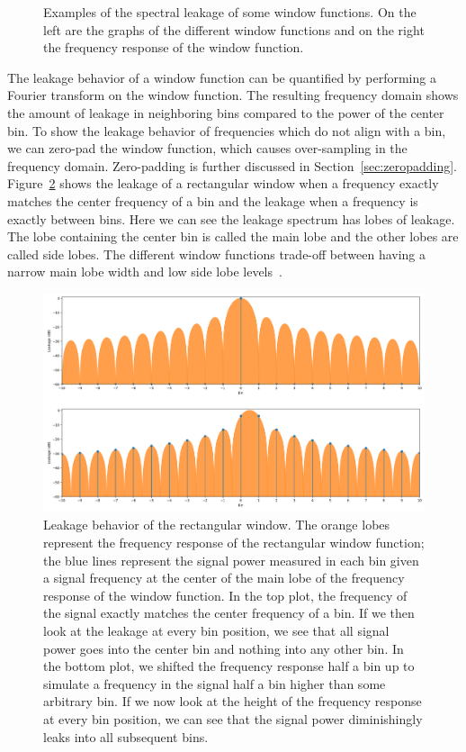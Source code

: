 \documentclass[a4paper,10pt,twocolumn]{article}
\begin{document}
\begin{figure}[h]
    \caption{Examples of the spectral leakage of some window functions. On the left are the graphs of the different window functions and on the right the frequency response of the window function.}
    \label{fig:windowfunceffect}
\end{figure}

The leakage behavior of a window function can be quantified by performing a Fourier transform on the window function. The resulting frequency domain shows the amount of leakage in neighboring bins compared to the power of the center bin. To show the leakage behavior of frequencies which do not align with a bin, we can zero-pad the window function, which causes over-sampling in the frequency domain. Zero-padding is further discussed in Section~\ref{sec:zeropadding}. Figure~\ref{fig:winleak} shows the leakage of a rectangular window when a frequency exactly matches the center frequency of a bin and the leakage when a frequency is exactly between bins. Here we can see the leakage spectrum has lobes of leakage. The lobe containing the center bin is called the main lobe and the other lobes are called side lobes. The different window functions trade-off between having a narrow main lobe width and low side lobe levels~\cite{windowfunc}.
\begin{figure}[b]
    \centering
    \includegraphics[width=\linewidth]{fig/winleak.png}
    \caption{Leakage behavior of the rectangular window. The orange lobes represent the frequency response of the rectangular window function; the blue lines represent the signal power measured in each bin given a signal frequency at the center of the main lobe of the frequency response of the window function. In the top plot, the frequency of the signal exactly matches the center frequency of a bin. If we then look at the leakage at every bin position, we see that all signal power goes into the center bin and nothing into any other bin. In the bottom plot, we shifted the frequency response half a bin up to simulate a frequency in the signal half a bin higher than some arbitrary bin. If we now look at the height of the frequency response at every bin position, we can see that the signal power diminishingly leaks into all subsequent bins.}
    \label{fig:winleak}
\end{figure}
\end{document}
